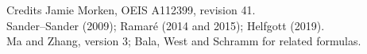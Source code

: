 \documentclass{beamer}
\begin{document}
\begin{frame}{Credits}
  Jamie Morken, OEIS A112399, revision 41.\\[0.5em]
  Sander--Sander (2009); Ramaré (2014 and 2015); Helfgott (2019).\\[0.5em]
  Ma and Zhang, version 3; Bala, West and Schramm for related formulas.
\end{frame}
\appendix
\FormalVerification
\end{document}
